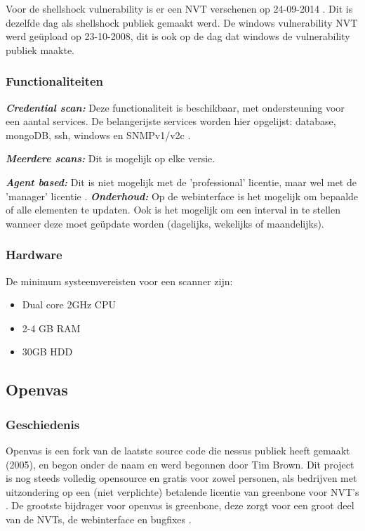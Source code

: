 Voor de shellshock vulnerability is er een NVT verschenen op 24-09-2014 \textcite{Vulners-shellshock-nessus}. Dit is dezelfde dag als shellshock publiek gemaakt werd. De windows vulnerability NVT werd geüpload op 23-10-2008, dit is ook op de dag dat windows de vulnerability publiek maakte.
 

\subsubsection{Functionaliteiten}
\textbf{\textit{Credential scan: }} Deze functionaliteit is beschikbaar, met ondersteuning voor een aantal services. De belangerijste services worden hier opgelijst: database, mongoDB, ssh, windows en SNMPv1/v2c \textcite{Nessus-functions}.

\textbf{\textit{Meerdere scans: }} Dit is mogelijk op elke versie.

\textbf{\textit{Agent based: }} Dit is niet mogelijk met de 'professional' licentie, maar wel met de 'manager' licentie \textcite{Nessus-functions}.
\textbf{\textit{Onderhoud: }} Op de webinterface is het mogelijk om bepaalde of alle  elementen te updaten. Ook is het mogelijk om een interval in te stellen wanneer deze moet geüpdate worden (dagelijks, wekelijks of maandelijks).

\subsubsection{Hardware}
De minimum systeemvereisten voor een scanner zijn:

\begin{itemize}
\item Dual core 2GHz CPU
\item 2-4 GB RAM
\item 30GB HDD
\end{itemize}

\textcite{Nessus-requirements}


\subsection{Openvas}

\subsubsection{Geschiedenis}
Openvas is een fork van de laatste source code die nessus publiek heeft gemaakt (2005), en begon onder de naam \textcite{Securiteam} en werd begonnen door Tim Brown. Dit project is nog steeds volledig opensource \textcite{Openvas-source} en gratis voor zowel personen, als bedrijven met uitzondering op een (niet verplichte) betalende licentie van greenbone voor NVT's \textcite{Openvas-nvt}. De grootste bijdrager voor openvas is greenbone, deze zorgt voor een groot deel van de NVTs, de webinterface en bugfixes \textcite{Openvas-contributors}.

